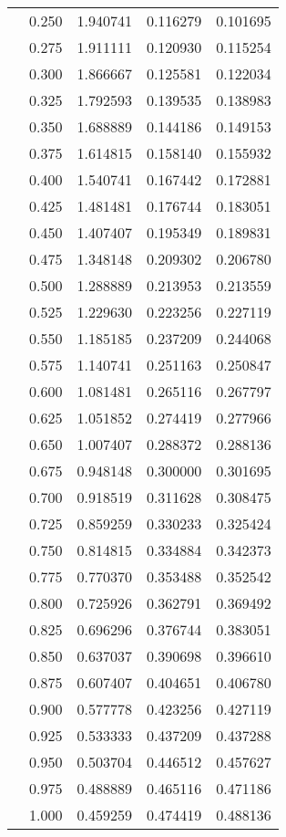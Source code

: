 \begin{tabular}{llrrr}
         & 0.250 &   1.940741 &   0.116279 &   0.101695 \\
         & 0.275 &   1.911111 &   0.120930 &   0.115254 \\
         & 0.300 &   1.866667 &   0.125581 &   0.122034 \\
         & 0.325 &   1.792593 &   0.139535 &   0.138983 \\
         & 0.350 &   1.688889 &   0.144186 &   0.149153 \\
         & 0.375 &   1.614815 &   0.158140 &   0.155932 \\
         & 0.400 &   1.540741 &   0.167442 &   0.172881 \\
         & 0.425 &   1.481481 &   0.176744 &   0.183051 \\
         & 0.450 &   1.407407 &   0.195349 &   0.189831 \\
         & 0.475 &   1.348148 &   0.209302 &   0.206780 \\
         & 0.500 &   1.288889 &   0.213953 &   0.213559 \\
         & 0.525 &   1.229630 &   0.223256 &   0.227119 \\
         & 0.550 &   1.185185 &   0.237209 &   0.244068 \\
         & 0.575 &   1.140741 &   0.251163 &   0.250847 \\
         & 0.600 &   1.081481 &   0.265116 &   0.267797 \\
         & 0.625 &   1.051852 &   0.274419 &   0.277966 \\
         & 0.650 &   1.007407 &   0.288372 &   0.288136 \\
         & 0.675 &   0.948148 &   0.300000 &   0.301695 \\
         & 0.700 &   0.918519 &   0.311628 &   0.308475 \\
         & 0.725 &   0.859259 &   0.330233 &   0.325424 \\
         & 0.750 &   0.814815 &   0.334884 &   0.342373 \\
         & 0.775 &   0.770370 &   0.353488 &   0.352542 \\
         & 0.800 &   0.725926 &   0.362791 &   0.369492 \\
         & 0.825 &   0.696296 &   0.376744 &   0.383051 \\
         & 0.850 &   0.637037 &   0.390698 &   0.396610 \\
         & 0.875 &   0.607407 &   0.404651 &   0.406780 \\
         & 0.900 &   0.577778 &   0.423256 &   0.427119 \\
         & 0.925 &   0.533333 &   0.437209 &   0.437288 \\
         & 0.950 &   0.503704 &   0.446512 &   0.457627 \\
         & 0.975 &   0.488889 &   0.465116 &   0.471186 \\
         & 1.000 &   0.459259 &   0.474419 &   0.488136 \\
\bottomrule
\end{tabular}
